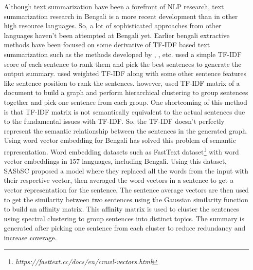 \documentclass[acmlarge]{acmart}
\begin{document}
Although text summarization have been a forefront of NLP research, text summarization research in Bengali is a more recent development than in other high resource languages. So, a lot of sophisticated approaches from other languages haven't been attempted at Bengali yet. Earlier bengali extractive methods have been focused on some derivative of TF-IDF based text summarization such as the methods developed by \citeauthor{chowdhury-etal-2021-tfidf-clustering} \cite{chowdhury-etal-2021-tfidf-clustering}, \citeauthor{das-2022-tfidf} \cite{das-2022-tfidf}, \citeauthor{sarkar-2012-tfidf} \cite{sarkar-2012-tfidf} etc. \citeauthor{sarkar-2012-tfidf} \cite{sarkar-2012-tfidf} used a simple TF-IDF score of each sentence to rank them and pick the best sentences to generate the output summary. \citeauthor{das-2022-tfidf} \cite{das-2022-tfidf} used weighted TF-IDF along with some other sentence features like sentence position to rank the sentences. \citeauthor{chowdhury-etal-2021-tfidf-clustering} \cite{chowdhury-etal-2021-tfidf-clustering} however, used TF-IDF matrix of a document to build a graph and perform hierarchical clustering to group sentences together and pick one sentence from each group. One shortcoming of this method is that TF-IDF matrix is not semantically equivalent to the actual sentences due to the fundamental issues with TF-IDF. So, the TF-IDF doesn't perfectly represent the semantic relationship between the sentences in the generated graph. Using word vector embedding for Bengali has solved this problem of semantic representation. Word embedding datasets such as FastText \cite{grave-etal-2018-fasttext} dataset\footnote{\textit{https://fasttext.cc/docs/en/crawl-vectors.html}} with word vector embeddings in 157 languages, including Bengali. Using this dataset, SASbSC \cite{roychowdhury-etal-2022-spectral-base} proposed a model where they replaced all the words from the input with their respective vector, then averaged the word vectors in a sentence to get a vector representation for the sentence. The sentence average vectors are then used to get the similarity between two sentences using the Gaussian similarity function to build an affinity matrix. This affinity matrix is used to cluster the sentences using spectral clustering to group sentences into distinct topics. The summary is generated after picking one sentence from each cluster to reduce redundancy and increase coverage.\\
\end{document}
